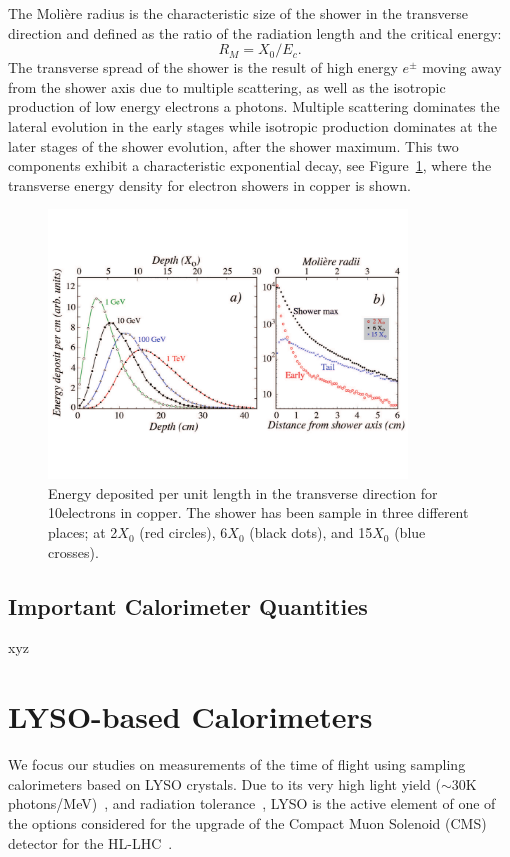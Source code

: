 The Moli\`ere radius is the characteristic size of the shower in the transverse
direction and defined as the ratio
of the radiation length and the critical energy:
\begin{equation}
R_{M} = X_{0}/E_{c}.
\end{equation} 
The transverse spread of the shower is the result of high
energy $e^{\pm}$ moving away from the shower axis due to multiple scattering, as well as the
isotropic production of low energy electrons a photons. Multiple
scattering dominates the lateral evolution in the early stages while
isotropic production dominates at the later stages of the shower
evolution, after the shower maximum. This two components exhibit a
characteristic exponential decay, see
Figure~\ref{fig:transverseProfile}, where the transverse energy density for
electron showers in copper is shown.
\begin{figure}[h] \centering
\includegraphics[width=0.85\textwidth]{calorimetry/ShowerProfile_Left.pdf}
\caption{Energy deposited per unit length in the transverse direction for
10\GeV electrons in copper. The shower has been sample in three
different places; at 2$X_{0}$ (red circles), 6$X_{0}$ (black dots),
and 15$X_{0}$ (blue crosses).}
\label{fig:transverseProfile}
\end{figure}

\subsection{Important Calorimeter Quantities}
 xyz

\section{LYSO-based Calorimeters}\label{lyso-cal}
We focus our studies on measurements of the time of flight using sampling calorimeters 
based on LYSO crystals. Due to its very high light yield 
($\sim 30$K photons/MeV)~\cite{LYSOProperties}, and radiation 
tolerance~\cite{5402126, 4291695, 5402125, Dissertori:2013rma}, LYSO
is the active element of one of the options considered for the upgrade of the
Compact Muon Solenoid (CMS) detector for the HL-LHC~\cite{Contardo:1605208}. 

